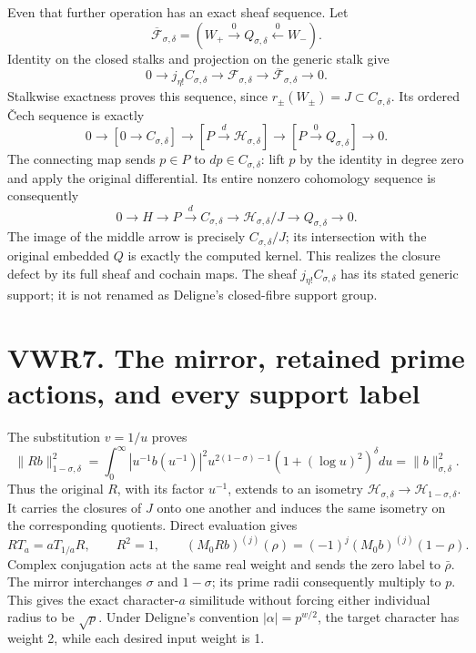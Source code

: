Even that further operation has an exact sheaf sequence. Let \[
\overline{\mathcal F}_{\sigma,\delta}
=(W_+\xrightarrow0 Q_{\sigma,\delta}\xleftarrow0 W_-).
\] Identity on the closed stalks and projection on the generic stalk
give \[
0\longrightarrow j_{\eta!}C_{\sigma,\delta}
\longrightarrow\mathcal F_{\sigma,\delta}
\longrightarrow\overline{\mathcal F}_{\sigma,\delta}
\longrightarrow0.
\tag{VWR6.5}
\] Stalkwise exactness proves this sequence, since
\(r_\pm(W_\pm)=J\subset C_{\sigma,\delta}\). Its ordered Čech sequence
is exactly \[
0\to[0\to C_{\sigma,\delta}]
\to[P\xrightarrow d\mathcal H_{\sigma,\delta}]
\to[P\xrightarrow0Q_{\sigma,\delta}]\to0.
\] The connecting map sends \(p\in P\) to \(dp\in C_{\sigma,\delta}\):
lift \(p\) by the identity in degree zero and apply the original
differential. Its entire nonzero cohomology sequence is consequently \[
0\to H\to P\xrightarrow d C_{\sigma,\delta}
\longrightarrow\mathcal H_{\sigma,\delta}/J
\longrightarrow Q_{\sigma,\delta}\to0.
\tag{VWR6.6}
\] The image of the middle arrow is precisely \(C_{\sigma,\delta}/J\);
its intersection with the original embedded \(Q\) is exactly the
computed kernel. This realizes the closure defect by its full sheaf and
cochain maps. The sheaf \(j_{\eta!}C_{\sigma,\delta}\) has its stated
generic support; it is not renamed as Deligne's closed-fibre support
group.

\section{VWR7. The mirror, retained prime actions, and every support
label}\label{vwr7.-the-mirror-retained-prime-actions-and-every-support-label}

The substitution \(v=1/u\) proves \[
\|Rb\|_{1-\sigma,\delta}^2
=\int_0^\infty|u^{-1}b(u^{-1})|^2u^{2(1-\sigma)-1}
 (1+(\log u)^2)^\delta du
=\|b\|_{\sigma,\delta}^2.
\tag{VWR7.1}
\] Thus the original \(R\), with its factor \(u^{-1}\), extends to an
isometry \(\mathcal H_{\sigma,\delta}\to\mathcal H_{1-\sigma,\delta}\).
It carries the closures of \(J\) onto one another and induces the same
isometry on the corresponding quotients. Direct evaluation gives \[
RT_a=aT_{1/a}R,\qquad R^2=1,
\qquad (M_0Rb)^{(j)}(\rho)=(-1)^j(M_0b)^{(j)}(1-\rho).
\tag{VWR7.2}
\] Complex conjugation acts at the same real weight and sends the zero
label to \(\bar\rho\). The mirror interchanges \(\sigma\) and
\(1-\sigma\); its prime radii consequently multiply to \(p\). This gives
the exact character-\(a\) similitude without forcing either individual
radius to be \(\sqrt p\). Under Deligne's convention
\(|\alpha|=p^{w/2}\), the target character has weight 2, while each
desired input weight is 1.

